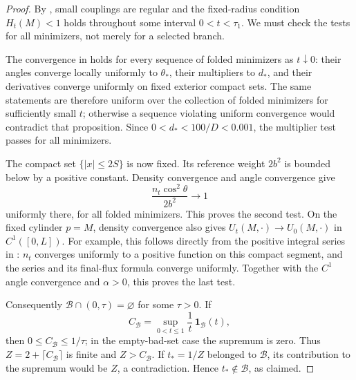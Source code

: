 \begin{proof}
By , small couplings are regular and
the fixed-radius condition \(H_t(M)<1\) holds throughout some
interval \(0<t<\tau_1\).  We must check the tests for all minimizers,
not merely for a selected branch.

The convergence in  holds for every
sequence of folded minimizers as \(t\downarrow0\): their angles
converge locally uniformly to \(\theta_*\), their multipliers to
\(d_*\), and their derivatives converge uniformly on fixed exterior
compact sets.  The same statements are therefore uniform over
the collection of folded minimizers for sufficiently small \(t\);
otherwise a sequence violating uniform convergence would
contradict that proposition.  Since
\(0<d_*<100/D<0.001\), the multiplier test passes for all
minimizers.

The compact set \(\{|x|\le2S\}\) is now fixed.  Its reference
weight \(2b^2\) is bounded below by a positive constant.  Density
convergence and angle convergence give
\[
 \frac{n_t\cos^2\theta}{2b^2}\longrightarrow1
\]
uniformly there, for all folded minimizers.  This proves the
second test.  On the fixed cylinder \(p=M\), density convergence
also gives \(U_t(M,\cdot)\to U_0(M,\cdot)\) in \(C^1([0,L])\).
For example, this follows directly from the positive integral
series in : \(n_t\) converges uniformly
to a positive function on this compact segment, and the series
and its final-flux formula converge uniformly.  Together with
the \(C^1\) angle convergence and \(\alpha>0\), this proves the
last test.

Consequently \(\mathcal B\cap(0,\tau)=\varnothing\) for some
\(\tau>0\).  If
\[
 C_{\mathcal B}
 =\sup_{0<t\le1}\frac1t\,\mathbf1_{\mathcal B}(t),
\]
then \(0\le C_{\mathcal B}\le1/\tau\); in the empty-bad-set case
the supremum is zero.  Thus \(Z=2+\lceil C_{\mathcal B}\rceil\)
is finite and \(Z>C_{\mathcal B}\).  If \(t_*=1/Z\) belonged
to \(\mathcal B\), its contribution to the supremum would be
\(Z\), a contradiction.  Hence \(t_*\notin\mathcal B\), as claimed.
\end{proof}


